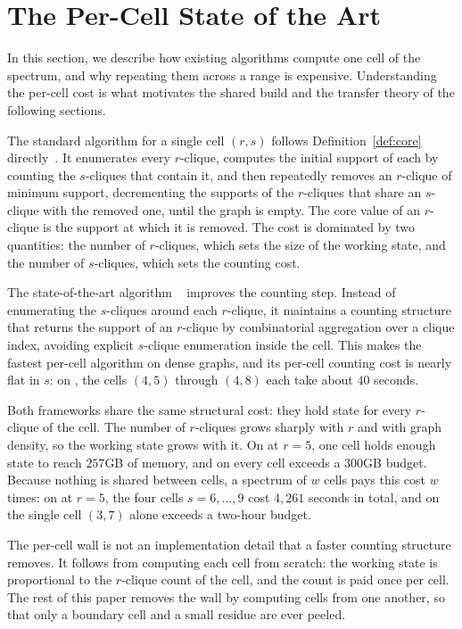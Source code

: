 \section{The Per-Cell State of the Art}
\label{sec:sota}

In this section, we describe how existing algorithms compute one cell of the spectrum, and why repeating them across a range is expensive.
%
Understanding the per-cell cost is what motivates the shared build and the transfer theory of the following sections.

The standard algorithm for a single cell $(r,s)$ follows Definition~\ref{def:core} directly~\cite{firstNucleus, nuclearTWEB}.
%
It enumerates every $r$-clique, computes the initial support of each by counting the $s$-cliques that contain it, and then repeatedly removes an $r$-clique of minimum support, decrementing the supports of the $r$-cliques that share an $s$-clique with the removed one, until the graph is empty.
%
The core value of an $r$-clique is the support at which it is removed.
%
The cost is dominated by two quantities: the number of $r$-cliques, which sets the size of the working state, and the number of $s$-cliques, which sets the counting cost.

The state-of-the-art algorithm \cnd~\cite{LocalNuclear} improves the counting step.
%
Instead of enumerating the $s$-cliques around each $r$-clique, it maintains a counting structure that returns the support of an $r$-clique by combinatorial aggregation over a clique index, avoiding explicit $s$-clique enumeration inside the cell.
%
This makes \cnd{} the fastest per-cell algorithm on dense graphs, and its per-cell counting cost is nearly flat in $s$: on \daAST{}, the cells $(4,5)$ through $(4,8)$ each take about $40$ seconds.

Both frameworks share the same structural cost: they hold state for every $r$-clique of the cell.
%
The number of $r$-cliques grows sharply with $r$ and with graph density, so the working state grows with it.
%
On \daDBL{} at $r{=}5$, one cell holds enough state to reach $257$GB of memory, and on \daWIT{} every cell exceeds a $300$GB budget.
%
Because nothing is shared between cells, a spectrum of $w$ cells pays this cost $w$ times: on \daDBL{} at $r{=}5$, the four cells $s{=}6,\dots,9$ cost $4{,}261$ seconds in total, and on \daHEP{} the single cell $(3,7)$ alone exceeds a two-hour budget.

\begin{remark}
The per-cell wall is not an implementation detail that a faster counting structure removes.
%
It follows from computing each cell from scratch: the working state is proportional to the $r$-clique count of the cell, and the count is paid once per cell.
%
The rest of this paper removes the wall by computing cells from one another, so that only a boundary cell and a small residue are ever peeled.
\end{remark}
